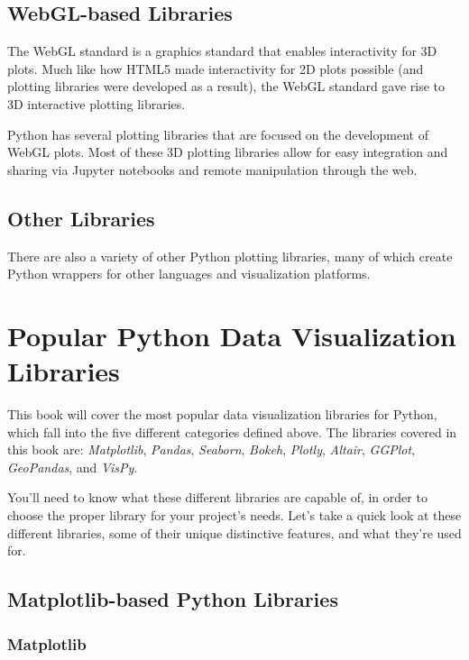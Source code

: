 \documentclass[11pt]{article}
\begin{document}
\subsection{WebGL-based Libraries}\label{webgl-based-libraries}

The WebGL standard is a graphics standard that enables interactivity for
3D plots. Much like how HTML5 made interactivity for 2D plots possible
(and plotting libraries were developed as a result), the WebGL standard
gave rise to 3D interactive plotting libraries.

Python has several plotting libraries that are focused on the
development of WebGL plots. Most of these 3D plotting libraries allow
for easy integration and sharing via Jupyter notebooks and remote
manipulation through the web.

\subsection{Other Libraries}\label{other-libraries}

There are also a variety of other Python plotting libraries, many of
which create Python wrappers for other languages and visualization
platforms.

\section{Popular Python Data Visualization
Libraries}\label{popular-python-data-visualization-libraries}

This book will cover the most popular data visualization libraries for
Python, which fall into the five different categories defined above. The
libraries covered in this book are: \emph{Matplotlib}, \emph{Pandas},
\emph{Seaborn}, \emph{Bokeh}, \emph{Plotly}, \emph{Altair},
\emph{GGPlot}, \emph{GeoPandas}, and \emph{VisPy}.

You'll need to know what these different libraries are capable of, in
order to choose the proper library for your project's needs. Let's take
a quick look at these different libraries, some of their unique
distinctive features, and what they're used for.

\subsection{Matplotlib-based Python
Libraries}\label{matplotlib-based-python-libraries}

\subsubsection{Matplotlib}\label{matplotlib}
\end{document}
